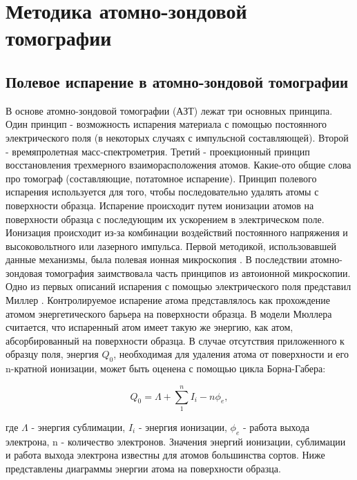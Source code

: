 \chapter{Методика атомно-зондовой томографии}\label{ch:ch1}



\section{Полевое испарение в атомно-зондовой томографии}\label{sec:ch1/sec1}

В основе атомно-зондовой томографии (АЗТ) лежат три основных принципа. Один принцип - возможность испарения материала с помощью постоянного электрического поля (в некоторых случаях с импульсной составляющей). Второй - времяпролетная масс-спектрометрия. Третий - проекционный принцип восстановления трехмерного взаиморасположения атомов. Какие-ото общие слова про томограф (составляющие, потатомное испарение). Принцип полевого испарения используется для того, чтобы последовательно удалять атомы с поверхности образца. Испарение происходит путем ионизации атомов на поверхности образца с последующим их ускорением в электрическом поле. Ионизация происходит из-за комбинации воздействий постоянного напряжения и высоковольтного или лазерного импульса. Первой методикой, использовавшей данные механизмы, была полевая ионная микроскопия \cite{Muller60}. В последствии атомно-зондовая томография заимствовала часть принципов из автоионной микроскопии.
Одно из первых описаний испарения с помощью электрического поля представил Миллер \cite{Muller56}. Контролируемое испарение атома представлялось как прохождение атомом энергетического барьера на поверхности образца. В модели Мюллера считается, что испаренный атом имеет такую же энергию, как атом, абсорбированный на поверхности образца. В случае отсутствия приложенного к образцу поля, энергия $Q_0$, необходимая для удаления атома от поверхности и его n-кратной ионизации, может быть оценена с помощью цикла Борна-Габера:

\begin{equation}
	\label{eq:equation1}
	Q_0 = \Lambda + \sum_{1}^{n} I_i -n\phi_e,
\end{equation}

где $\Lambda$ - энергия сублимации, $I_i$ - энергия ионизации, $\phi_e$ - работа выхода электрона, n - количество электронов. Значения энергий ионизации, сублимации и работа выхода электрона известны для атомов большинства сортов. Ниже представлены диаграммы энергии атома на поверхности образца.

